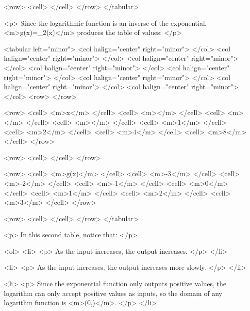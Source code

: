             <row>
                <cell> </cell>
            </row>
        </tabular>

        <p>
            Since the logarithmic function is an inverse of the exponential, <m>g(x)=\log_{2}(x)</m> produces the table of values:
        </p>

        <tabular left="minor">
            <col halign="center" right="minor"> </col> <col halign="center" right="minor"> </col> <col halign="center" right="minor"> </col> <col halign="center" right="minor"> </col> <col halign="center" right="minor"> </col> <col halign="center" right="minor"> </col> <col halign="center" right="minor"> </col> <col halign="center" right="minor"> </col>
            <row>
            </row>

            <row>
                <cell> <m>x</m> </cell>
                <cell> <m></m> </cell>
                <cell> <m></m> </cell>
                <cell> <m></m> </cell>
                <cell> <m>1</m> </cell>
                <cell> <m>2</m> </cell>
                <cell> <m>4</m> </cell>
                <cell> <m>8</m> </cell>
            </row>

            <row>
                <cell> </cell>
            </row>

            <row>
                <cell> <m>g(x)</m> </cell>
                <cell> <m>-3</m> </cell>
                <cell> <m>-2</m> </cell>
                <cell> <m>-1</m> </cell>
                <cell> <m>0</m> </cell>
                <cell> <m>1</m> </cell>
                <cell> <m>2</m> </cell>
                <cell> <m>3</m> </cell>
            </row>

            <row>
                <cell> </cell>
            </row>
        </tabular>

        <p>
            In this second table, notice that:
        </p>

        <ol>
            <li>
                <p>
                    As the input increases, the output increases.
                </p>
            </li>

            <li>
                <p>
                    As the input increases, the output increases more slowly.
                </p>
            </li>

            <li>
                <p>
                    Since the exponential function only outputs positive values, the logarithm can only accept positive values as inputs, so the domain of any logarithm function is <m>(0,\infty)</m>.
                </p>
            </li>

